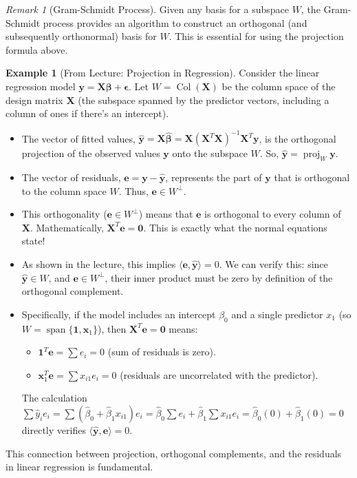 \documentclass[11pt]{article}
\theoremstyle{definition}
\newtheorem{example}[theorem]{Example}
\theoremstyle{remark}
\newtheorem{remark}[theorem]{Remark}
\newcommand{\Span}{\operatorname{span}}
\newcommand{\col}{\operatorname{Col}}
\newcommand{\inner}[2]{\langle #1, #2 \rangle}
\newcommand{\proj}{\operatorname{proj}}
\newcommand{\ortho}{\perp}
\newcommand{\trans}{^T} %
\begin{document}
\begin{remark}[Gram-Schmidt Process]
Given any basis for a subspace $W$, the Gram-Schmidt process provides an algorithm to construct an orthogonal (and subsequently orthonormal) basis for $W$. This is essential for using the projection formula above.
\end{remark}

\begin{example}[From Lecture: Projection in Regression]
Consider the linear regression model $\mathbf{y} = \mathbf{X}\boldsymbol{\beta} + \boldsymbol{\epsilon}$.
Let $W = \col(\mathbf{X})$ be the column space of the design matrix $\mathbf{X}$ (the subspace spanned by the predictor vectors, including a column of ones if there's an intercept).
\begin{itemize}
    \item The vector of fitted values, $\hat{\mathbf{y}} = \mathbf{X}\hat{\boldsymbol{\beta}} = \mathbf{X}(\mathbf{X}\trans\mathbf{X})^{-1}\mathbf{X}\trans\mathbf{y}$, is the orthogonal projection of the observed values $\mathbf{y}$ onto the subspace $W$. So, $\hat{\mathbf{y}} = \proj_W \mathbf{y}$.
    \item The vector of residuals, $\mathbf{e} = \mathbf{y} - \hat{\mathbf{y}}$, represents the part of $\mathbf{y}$ that is orthogonal to the column space $W$. Thus, $\mathbf{e} \in W^\ortho$.
    \item This orthogonality ($\mathbf{e} \in W^\ortho$) means that $\mathbf{e}$ is orthogonal to every column of $\mathbf{X}$. Mathematically, $\mathbf{X}\trans \mathbf{e} = \mathbf{0}$. This is exactly what the normal equations state!
    \item As shown in the lecture, this implies $\inner{\mathbf{e}}{\hat{\mathbf{y}}} = 0$. We can verify this: since $\hat{\mathbf{y}} \in W$, and $\mathbf{e} \in W^\ortho$, their inner product must be zero by definition of the orthogonal complement.
    \item Specifically, if the model includes an intercept $\beta_0$ and a single predictor $x_1$ (so $W = \Span\{\mathbf{1}, \mathbf{x}_1\}$), then $\mathbf{X}\trans \mathbf{e} = \mathbf{0}$ means:
        \begin{itemize}
            \item $\mathbf{1}\trans \mathbf{e} = \sum e_i = 0$ (sum of residuals is zero).
            \item $\mathbf{x}_1\trans \mathbf{e} = \sum x_{i1} e_i = 0$ (residuals are uncorrelated with the predictor).
        \end{itemize}
        The calculation $\sum \hat{y}_i e_i = \sum (\hat{\beta}_0 + \hat{\beta}_1 x_{i1}) e_i = \hat{\beta}_0 \sum e_i + \hat{\beta}_1 \sum x_{i1} e_i = \hat{\beta}_0(0) + \hat{\beta}_1(0) = 0$ directly verifies $\inner{\hat{\mathbf{y}}}{\mathbf{e}}=0$.
\end{itemize}
This connection between projection, orthogonal complements, and the residuals in linear regression is fundamental.
\end{example}
\end{document}
